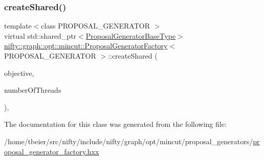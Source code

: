\subsubsection{\texorpdfstring{create\+Shared()}{createShared()}}
{\footnotesize\ttfamily template$<$class P\+R\+O\+P\+O\+S\+A\+L\+\_\+\+G\+E\+N\+E\+R\+A\+T\+OR $>$ \\
virtual std\+::shared\+\_\+ptr$<$\hyperlink{classnifty_1_1graph_1_1opt_1_1mincut_1_1ProposalGeneratorFactory_a634f08de07b4d74a6892c6edbcb4d511}{Proposal\+Generator\+Base\+Type}$>$ \hyperlink{classnifty_1_1graph_1_1opt_1_1mincut_1_1ProposalGeneratorFactory}{nifty\+::graph\+::opt\+::mincut\+::\+Proposal\+Generator\+Factory}$<$ P\+R\+O\+P\+O\+S\+A\+L\+\_\+\+G\+E\+N\+E\+R\+A\+T\+OR $>$\+::create\+Shared (\begin{DoxyParamCaption}\item[{const \hyperlink{classnifty_1_1graph_1_1opt_1_1mincut_1_1ProposalGeneratorFactory_a1cecd1f1a7909707878facc94c3675e9}{Objective\+Type} \&}]{objective,  }\item[{const size\+\_\+t}]{number\+Of\+Threads }\end{DoxyParamCaption})\hspace{0.3cm}{\ttfamily [inline]}, {\ttfamily [virtual]}}



The documentation for this class was generated from the following file\+:\begin{DoxyCompactItemize}
\item 
/home/tbeier/src/nifty/include/nifty/graph/opt/mincut/proposal\+\_\+generators/\hyperlink{mincut_2proposal__generators_2proposal__generator__factory_8hxx}{proposal\+\_\+generator\+\_\+factory.\+hxx}\end{DoxyCompactItemize}
